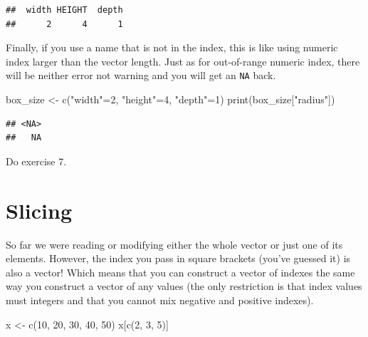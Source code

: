 \documentclass[
]{book}
\newenvironment{Shaded}{\begin{snugshade}}{\end{snugshade}}
\newcommand{\DecValTok}[1]{\textcolor[rgb]{0.00,0.00,0.81}{#1}}
\newcommand{\FunctionTok}[1]{\textcolor[rgb]{0.00,0.00,0.00}{#1}}
\newcommand{\NormalTok}[1]{#1}
\newcommand{\OtherTok}[1]{\textcolor[rgb]{0.56,0.35,0.01}{#1}}
\newcommand{\StringTok}[1]{\textcolor[rgb]{0.31,0.60,0.02}{#1}}
\begin{document}
\begin{verbatim}
##  width HEIGHT  depth 
##      2      4      1
\end{verbatim}

Finally, if you use a name that is not in the index, this is like using numeric index larger than the vector length. Just as for out-of-range numeric index, there will be neither error not warning and you will get an \texttt{NA} back.

\begin{Shaded}
\begin{Highlighting}[]
\NormalTok{box\_size }\OtherTok{\textless{}{-}} \FunctionTok{c}\NormalTok{(}\StringTok{"width"}\OtherTok{=}\DecValTok{2}\NormalTok{, }\StringTok{"height"}\OtherTok{=}\DecValTok{4}\NormalTok{, }\StringTok{"depth"}\OtherTok{=}\DecValTok{1}\NormalTok{) }
\FunctionTok{print}\NormalTok{(box\_size[}\StringTok{"radius"}\NormalTok{])}
\end{Highlighting}
\end{Shaded}

\begin{verbatim}
## <NA> 
##   NA
\end{verbatim}

Do exercise 7.

\hypertarget{vector-index-slicing}{%
\section{Slicing}\label{vector-index-slicing}}

So far we were reading or modifying either the whole vector or just one of its elements. However, the index you pass in square brackets (you've guessed it) is also a vector! Which means that you can construct a vector of indexes the same way you construct a vector of any values (the only restriction is that index values must integers and that you cannot mix negative and positive indexes).

\begin{Shaded}
\begin{Highlighting}[]
\NormalTok{x }\OtherTok{\textless{}{-}} \FunctionTok{c}\NormalTok{(}\DecValTok{10}\NormalTok{, }\DecValTok{20}\NormalTok{, }\DecValTok{30}\NormalTok{, }\DecValTok{40}\NormalTok{, }\DecValTok{50}\NormalTok{)}
\NormalTok{x[}\FunctionTok{c}\NormalTok{(}\DecValTok{2}\NormalTok{, }\DecValTok{3}\NormalTok{, }\DecValTok{5}\NormalTok{)]}
\end{Highlighting}
\end{Shaded}
\end{document}
